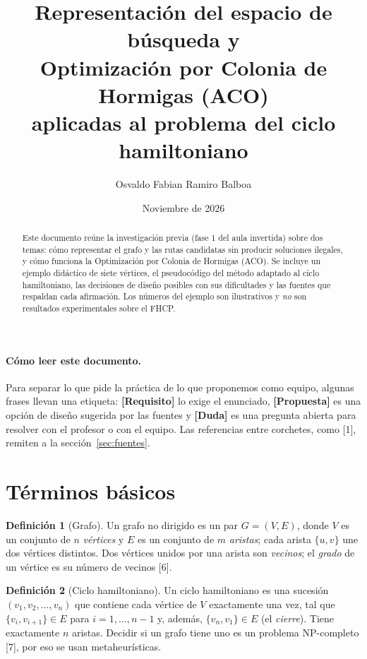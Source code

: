\documentclass[11pt,letterpaper]{article}
\title{Representación del espacio de búsqueda y\\
       Optimización por Colonia de Hormigas (ACO)\\
       \large aplicadas al problema del ciclo hamiltoniano}
\author{Osvaldo Fabian Ramiro Balboa}
\date{Noviembre de 2026}
\theoremstyle{definition}
\newtheorem{definicion}{Definición}
\newcommand{\req}{\textcolor{blue!60!black}{\textbf{[Requisito]}}}
\newcommand{\prop}{\textcolor{green!40!black}{\textbf{[Propuesta]}}}
\newcommand{\duda}{\textcolor{red!60!black}{\textbf{[Duda]}}}
\begin{document}
\maketitle

\begin{abstract}
Este documento reúne la investigación previa (fase 1 del aula invertida) sobre dos temas:
cómo representar el grafo y las rutas candidatas sin producir soluciones ilegales, y cómo
funciona la Optimización por Colonia de Hormigas (ACO). Se incluye un ejemplo didáctico de
siete vértices, el pseudocódigo del método adaptado al ciclo hamiltoniano, las decisiones de
diseño posibles con sus dificultades y las fuentes que respaldan cada afirmación. Los números
del ejemplo son ilustrativos y \emph{no} son resultados experimentales sobre el FHCP.
\end{abstract}

\paragraph{Cómo leer este documento.} Para separar lo que pide la práctica de lo que
proponemos como equipo, algunas frases llevan una etiqueta: \req{} lo exige el enunciado,
\prop{} es una opción de diseño sugerida por las fuentes y \duda{} es una pregunta abierta
para resolver con el profesor o con el equipo. Las referencias entre corchetes, como [1],
remiten a la sección~\ref{sec:fuentes}.

\tableofcontents

\section{Términos básicos}

\begin{definicion}[Grafo]
Un grafo no dirigido es un par $G=(V,E)$, donde $V$ es un conjunto de $n$ \emph{vértices}
y $E$ es un conjunto de $m$ \emph{aristas}; cada arista $\{u,v\}$ une dos vértices distintos.
Dos vértices unidos por una arista son \emph{vecinos}; el \emph{grado} de un vértice es su
número de vecinos [6].
\end{definicion}

\begin{definicion}[Ciclo hamiltoniano]
Un ciclo hamiltoniano es una sucesión $(v_1,v_2,\dots,v_n)$ que contiene cada vértice de $V$
exactamente una vez, tal que $\{v_i,v_{i+1}\}\in E$ para $i=1,\dots,n-1$ y, además,
$\{v_n,v_1\}\in E$ (el \emph{cierre}). Tiene exactamente $n$ aristas. Decidir si un grafo
tiene uno es un problema NP-completo [7], por eso se usan metaheurísticas.
\end{definicion}
\end{document}
